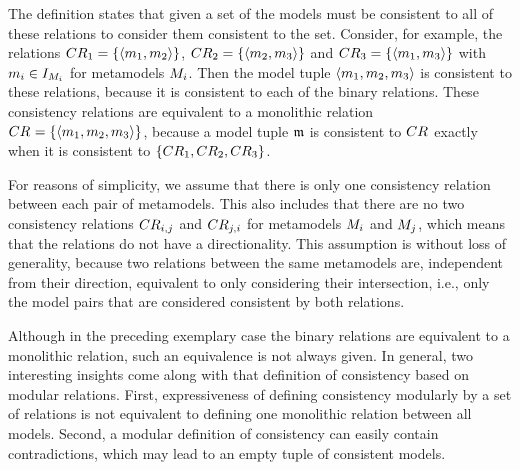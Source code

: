 The definition states that given a set of \modellevelconsistencyrelations the models must be consistent to all of these relations to consider them consistent to the set.
Consider, for example, the relations $CR_{1} = \{ \langle m_{1}, m_{2} \rangle \}$, $CR_{2} = \{ \langle m_{2},m_{3} \rangle \}$ and $CR_{3} = \{ \langle m_{1}, m_{3} \rangle \}$ with $m_{i} \in I_{M_{i}}$ for metamodels $M_{i}$. Then the model tuple $\langle m_{1}, m_{2}, m_{3} \rangle$ is consistent to these relations, because it is consistent to each of the binary relations.
These consistency relations are equivalent to a monolithic relation $CR_{} = \{ \langle m_{1}, m_{2}, m_{3} \rangle \}$, because a model tuple $\mathfrak{m}$ is consistent to $CR_{}$ exactly when it is consistent to $\{ CR_{1}, CR_{2}, CR_{3} \}$.

For reasons of simplicity, we assume that there is only one consistency relation between each pair of metamodels.
This also includes that there are no two consistency relations $CR_{i,j}$ and $CR_{j,i}$ for metamodels $M_{i}$ and $M_{j}$, which means that the relations do not have a directionality.
This assumption is without loss of generality, because two relations between the same metamodels are, independent from their direction, equivalent to only considering their intersection, i.e., only the model pairs that are considered consistent by both relations.


Although in the preceding exemplary case the binary relations are equivalent to a monolithic relation, such an equivalence is not always given. In general, two interesting insights come along with that definition of consistency based on modular relations. First, expressiveness of defining consistency modularly by a set of relations is not equivalent to defining one monolithic relation between all models. Second, a modular definition of consistency can easily contain contradictions, which may lead to an empty tuple of consistent models.

